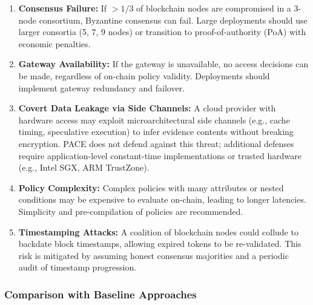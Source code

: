 \documentclass[pdflatex,sn-mathphys-num]{sn-jnl}
\begin{document}
\begin{enumerate}
	\item \textbf{Consensus Failure:} If $> 1/3$ of blockchain nodes are compromised in a 3-node consortium, Byzantine consensus can fail. Large deployments should use larger consortia (5, 7, 9 nodes) or transition to proof-of-authority (PoA) with economic penalties.

	\item \textbf{Gateway Availability:} If the gateway is unavailable, no access decisions can be made, regardless of on-chain policy validity. Deployments should implement gateway redundancy and failover.

	\item \textbf{Covert Data Leakage via Side Channels:} A cloud provider with hardware access may exploit microarchitectural side channels (e.g., cache timing, speculative execution) to infer evidence contents without breaking encryption. PACE does not defend against this threat; additional defenses require application-level constant-time implementations or trusted hardware (e.g., Intel SGX, ARM TrustZone).

	\item \textbf{Policy Complexity:} Complex policies with many attributes or nested conditions may be expensive to evaluate on-chain, leading to longer latencies. Simplicity and pre-compilation of policies are recommended.

	\item \textbf{Timestamping Attacks:} A coalition of blockchain nodes could collude to backdate block timestamps, allowing expired tokens to be re-validated. This risk is mitigated by assuming honest consensus majorities and a periodic audit of timestamp progression.
\end{enumerate}

\subsubsection{Comparison with Baseline Approaches}
\end{document}
